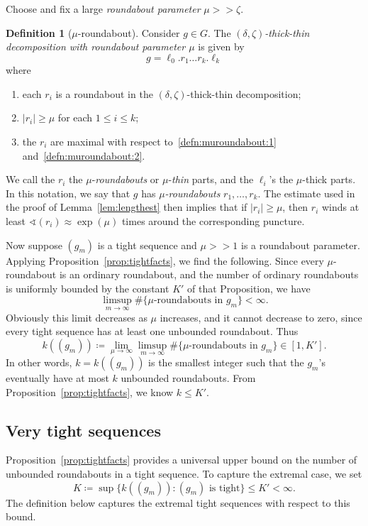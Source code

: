 \documentclass{amsart}
\theoremstyle{definition}
\newtheorem{defn}[thm]{Definition}
\theoremstyle{remark}
\renewcommand\gg{>\!\!>}
\begin{document}
Choose and fix a large \emph{roundabout parameter} $\mu\gg\zeta$.

\begin{defn}[$\mu$-roundabout]\label{defn:muroundabout}
  Consider $g\in G$. The \emph{$(\delta,\zeta)$-thick-thin decomposition with roundabout parameter $\mu$} is given by 
\[ g = \ell_0.r_1\ldots r_k.\ell_k\]
where 
\begin{enumerate}
\item each $r_i$ is a roundabout in the $(\delta, \zeta)$-thick-thin decomposition;\label{defn:muroundabout:1}
\item $|r_i| \geq \mu$ for each $1 \leq i \leq k$;\label{defn:muroundabout:2}
\item the $r_i$ are maximal with respect to~\eqref{defn:muroundabout:1} and~\eqref{defn:muroundabout:2}.
\end{enumerate}
\end{defn} 
We call the $r_i$ the $\mu$-\emph{roundabouts} or $\mu$-\emph{thin} parts, and the $\ell_i$'s the $\mu$-thick parts. In this notation, we say that $g$ has \emph{$\mu$-roundabouts} $r_1,\dots,r_k$. The estimate used in the proof of Lemma~\ref{lem:lengthest} then implies that if $|r_i| \ge \mu$, then $r_i$ winds at least $\sphericalangle(r_i)\approx \exp(\mu)$ times around the corresponding puncture.

Now suppose $(g_m)$ is a tight sequence and $\mu\gg1$ is a roundabout parameter.   Applying Proposition~\ref{prop:tightfacts}, we find the following. Since every $\mu$-roundabout is an ordinary roundabout, and the number of ordinary roundabouts is uniformly bounded by the constant $K'$ of that Proposition, we have 
\[ \limsup_{m\to\infty}\#\{\text{$\mu$-roundabouts in }g_m\} <\infty.\]
Obviously this limit decreases as $\mu$ increases, and it cannot decrease to zero, since every tight sequence has at least one unbounded roundabout.  Thus 
\begin{equation}
\label{eq:k_g}
k((g_m))\coloneqq\lim_{\mu\to\infty}\limsup_{m\to\infty}\#\{\text{$\mu$-roundabouts in }g_m\}\in [1, K'].
\end{equation}
In other words, $k=k((g_m))$ is the smallest integer such that the $g_m$'s eventually have at most $k$ unbounded roundabouts. From Proposition~\ref{prop:tightfacts}, we know $k \leq K'$. 

\subsection{Very tight sequences}
Proposition~\ref{prop:tightfacts} provides a universal upper bound on the number of unbounded roundabouts in a tight sequence.  To capture the extremal case, we set 
\[ K\coloneqq\sup\{k((g_m)) : (g_m) \text{ is tight}\} \leq K'<\infty.\]
The definition below captures the extremal tight sequences with respect to this bound. 
\end{document}
